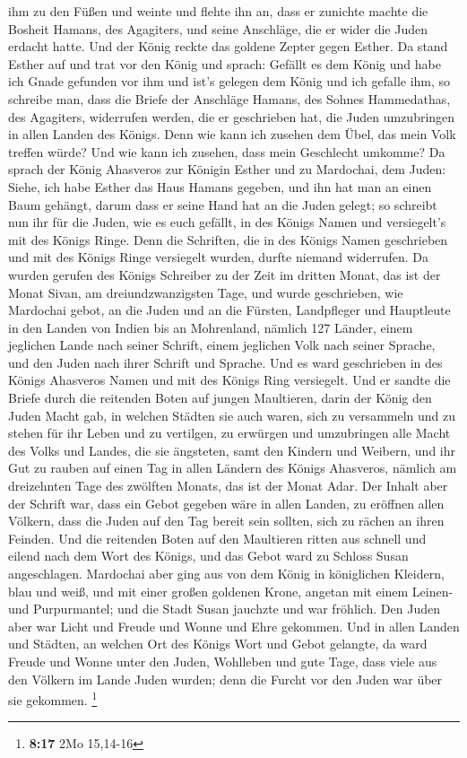 ihm zu den Füßen und weinte und flehte ihn an, dass er zunichte machte
die Bosheit Hamans, des Agagiters, und seine Anschläge, die er wider die
Juden erdacht hatte.  Und der König reckte das goldene
Zepter gegen Esther. Da stand Esther auf und trat vor den König
 und sprach: Gefällt es dem König und habe ich Gnade
gefunden vor ihm und ist's gelegen dem König und ich gefalle ihm, so
schreibe man, dass die Briefe der Anschläge Hamans, des Sohnes
Hammedathas, des Agagiters, widerrufen werden, die er geschrieben hat,
die Juden umzubringen in allen Landen des Königs.  Denn wie
kann ich zusehen dem Übel, das mein Volk treffen würde? Und wie kann ich
zusehen, dass mein Geschlecht umkomme?  Da sprach der König
Ahasveros zur Königin Esther und zu Mardochai, dem Juden: Siehe, ich
habe Esther das Haus Hamans gegeben, und ihn hat man an einen Baum
gehängt, darum dass er seine Hand hat an die Juden gelegt; 
so schreibt nun ihr für die Juden, wie es euch gefällt, in des Königs
Namen und versiegelt's mit des Königs Ringe. Denn die Schriften, die in
des Königs Namen geschrieben und mit des Königs Ringe versiegelt wurden,
durfte niemand widerrufen.  Da wurden gerufen des Königs
Schreiber zu der Zeit im dritten Monat, das ist der Monat Sivan, am
dreiundzwanzigsten Tage, und wurde geschrieben, wie Mardochai gebot, an
die Juden und an die Fürsten, Landpfleger und Hauptleute in den Landen
von Indien bis an Mohrenland, nämlich 127 Länder, einem jeglichen Lande
nach seiner Schrift, einem jeglichen Volk nach seiner Sprache, und den
Juden nach ihrer Schrift und Sprache.  Und es ward
geschrieben in des Königs Ahasveros Namen und mit des Königs Ring
versiegelt. Und er sandte die Briefe durch die reitenden Boten auf
jungen Maultieren,  darin der König den Juden Macht gab, in
welchen Städten sie auch waren, sich zu versammeln und zu stehen für ihr
Leben und zu vertilgen, zu erwürgen und umzubringen alle Macht des Volks
und Landes, die sie ängsteten, samt den Kindern und Weibern, und ihr Gut
zu rauben  auf einen Tag in allen Ländern des Königs
Ahasveros, nämlich am dreizehnten Tage des zwölften Monats, das ist der
Monat Adar.  Der Inhalt aber der Schrift war, dass ein
Gebot gegeben wäre in allen Landen, zu eröffnen allen Völkern, dass die
Juden auf den Tag bereit sein sollten, sich zu rächen an ihren Feinden.
 Und die reitenden Boten auf den Maultieren ritten aus
schnell und eilend nach dem Wort des Königs, und das Gebot ward zu
Schloss Susan angeschlagen.  Mardochai aber ging aus von
dem König in königlichen Kleidern, blau und weiß, und mit einer großen
goldenen Krone, angetan mit einem Leinen- und Purpurmantel; und die
Stadt Susan jauchzte und war fröhlich.  Den Juden aber war
Licht und Freude und Wonne und Ehre gekommen.  Und in allen
Landen und Städten, an welchen Ort des Königs Wort und Gebot gelangte,
da ward Freude und Wonne unter den Juden, Wohlleben und gute Tage, dass
viele aus den Völkern im Lande Juden wurden; denn die Furcht vor den
Juden war über sie gekommen. \footnote{\textbf{8:17} 2Mo 15,14-16}

